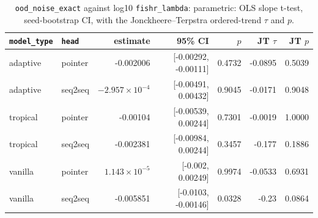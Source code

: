 \documentclass[10pt]{article}
\begin{document}
{\small
\begin{longtable}{llrrrrr}
\caption{\texttt{ood\_noise\_exact} against log10 \texttt{fishr\_lambda}: parametric: OLS slope t-test, seed-bootstrap CI, with the Jonckheere--Terpstra ordered-trend $\tau$ and $p$.}\label{tab:trend-ood_noise_exact}\\
\toprule
\texttt{model\_type} & \texttt{head} & estimate & 95\% CI & $p$ & JT $\tau$ & JT $p$\\
\midrule
\endhead
adaptive & pointer & -0.002006 & [-0.00292, -0.00111] & 0.4732 & -0.0895 & 0.5039\\
adaptive & seq2seq & $-2.957\times10^{-4}$ & [-0.00491, 0.00432] & 0.9045 & -0.0171 & 0.9048\\
tropical & pointer & -0.00104 & [-0.00539, 0.00244] & 0.7301 & -0.0019 & 1.0000\\
tropical & seq2seq & -0.002381 & [-0.00984, 0.00244] & 0.3457 & -0.177 & 0.1886\\
vanilla & pointer & $1.143\times10^{-5}$ & [-0.002, 0.00249] & 0.9974 & -0.0533 & 0.6931\\
vanilla & seq2seq & -0.005851 & [-0.0103, -0.00146] & 0.0328 & -0.23 & 0.0864\\
\bottomrule
\end{longtable}
}
\end{document}
